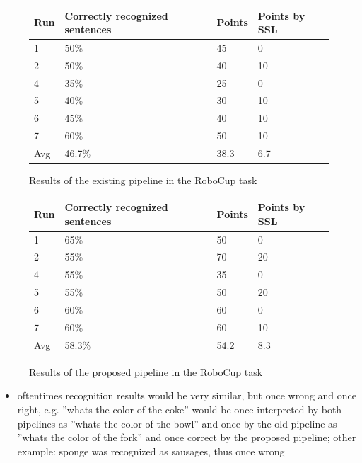 \begin{figure}[ht]
	\begin{tabular}{ | l | l | l | l |}
		\hline
		Run & Correctly recognized sentences & Points & Points by SSL \\ \hline
		1 & 50\% & 45 & 0 \\ \hline
		2 & 50\% & 40 & 10 \\ \hline
		4 & 35\% & 25 &  0 \\ \hline
		5 & 40\% & 30 & 10 \\ \hline
		6 & 45\% & 40 & 10 \\ \hline
		7 & 60\% & 50 & 10 \\ \hhline{|=|=|=|=|} 
		Avg & 46.7\% & 38.3 & 6.7 \\
		\hline
	\end{tabular}
	\caption{Results of the existing pipeline in the RoboCup task}
	\label{pic:eval_task_results_old}
\end{figure}

\begin{figure}[ht]
	\begin{tabular}{ | l | l | l | l |}
		\hline
		Run & Correctly recognized sentences & Points & Points by SSL \\ \hline
		1 & 65\% & 50 &  0 \\ \hline
		2 & 55\% & 70 & 20 \\ \hline
		4 & 55\% & 35 &  0 \\ \hline
		5 & 55\% & 50 & 20 \\ \hline
		6 & 60\% & 60 &  0 \\ \hline
		7 & 60\% & 60 & 10 \\ \hhline{|=|=|=|=|} 
		Avg & 58.3\% & 54.2 & 8.3\\
		\hline
	\end{tabular}
	\caption{Results of the proposed pipeline in the RoboCup task}
	\label{pic:eval_task_results_new}
\end{figure}

\begin{itemize}
	\item oftentimes recognition results would be very similar, but once wrong and once right, e.g. ''whats the color of the coke'' would be once interpreted by both pipelines as ''whats the color of the bowl'' and once by the old pipeline as ''whats the color of the fork'' and once correct by the proposed pipeline; other example: sponge was recognized as sausages, thus once wrong
\end{itemize}

